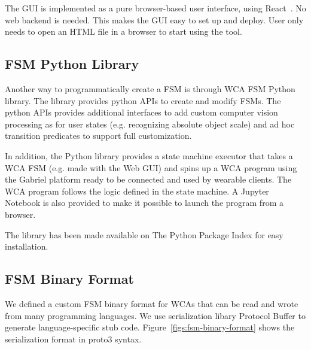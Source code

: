 The GUI is implemented as a pure browser-based user interface, using
React~\cite{staff2016react}. No web backend is needed. This makes the GUI easy
to set up and deploy. User only needs to open an HTML file in a browser to start
using the tool.

\subsection{FSM Python Library}

Another way to programmatically create a FSM is through WCA FSM Python library.
The library provides python APIs to create and modify FSMs. The python APIs
provides additional interfaces to add custom computer vision processing as for
user states (e.g. recognizing absolute object scale) and ad hoc transition
predicates to support full customization. 

In addition, the Python library provides a state machine executor that takes a
WCA FSM (e.g. made with the Web GUI) and spins up a WCA program using the
Gabriel platform ready to be connected and used by wearable clients. The WCA
program follows the logic defined in the state machine. A Jupyter Notebook is
also provided to make it possible to launch the program from a browser. 

The library has been made available on The Python Package Index for easy
installation.

\subsection{FSM Binary Format}

We defined a custom FSM binary format for WCAs that can be read and wrote from many
programming languages. We use serialization libary Protocol Buffer to generate
language-specific stub code. Figure~\ref{figs:fsm-binary-format} shows the
serialization format in proto3 syntax.


